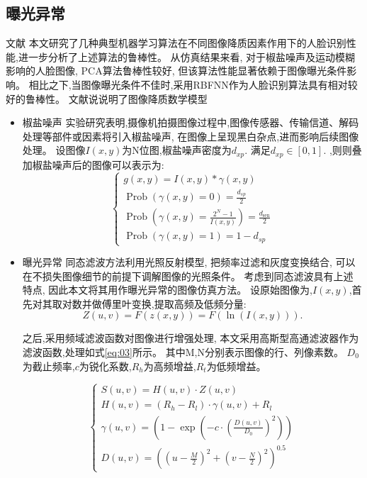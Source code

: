\message{ !name(main.tex)}\documentclass{amsart}
\begin{document}
\subsection{曝光异常}
文献 \cite{liliming} 本文研究了几种典型机器学习算法在不同图像降质因素作用下的人脸识别性能,进一步分析了上述算法的鲁棒性。
从仿真结果来看,
对于椒盐噪声及运动模糊影响的人脸图像,
PCA算法鲁棒性较好,
但该算法性能显著依赖于图像曝光条件影响。
相比之下,当图像曝光条件不佳时,采用RBFNN作为人脸识别算法具有相对较好的鲁棒性。
文献说说明了图像降质数学模型
\begin{itemize}
\item 椒盐噪声
  实验研究表明,摄像机拍摄图像过程中,图像传感器、传输信道、解码处理等部件或因素将引入椒盐噪声,
  在图像上呈现黑白杂点,进而影响后续图像处理。
  设图像$I(x,y)$为N位图,椒盐噪声密度为$d_{xp}$.
  满足$d_{xp}\in [0,1]$.
  ,则则叠加椒盐噪声后的图像可以表示为:
  \begin{equation}
    \label{eq:01}
  \left\{\begin{array}{l}
g(x, y)=I(x, y) * \gamma(x, y) \\
\operatorname{Prob}(\gamma(x, y)=0)=\frac{d_{s p}}{2} \\
\operatorname{Prob}\left(\gamma(x, y)=\frac{2^{N}-1}{I(x, y)}\right)=\frac{d_{\operatorname{sen}}}{2} \\
\operatorname{Prob}(\gamma(x, y)=1)=1-d_{s p}
\end{array}\right.
  \end{equation}

\item 曝光异常
  同态滤波方法利用光照反射模型,
  把频率过滤和灰度变换结合,
  可以在不损失图像细节的前提下调解图像的光照条件。
  考虑到同态滤波具有上述特点,
  因此本文将其用作曝光异常的图像仿真方法。
  设原始图像为,$I(x,y)$,首先对其取对数并做傅里叶变换,提取高频及低频分量:
  \begin{equation}
    \label{eq:02}
Z(u, v)=F(z(x, y))=F(\ln (I(x, y))).
  \end{equation}

  之后,采用频域滤波函数对图像进行增强处理,
  本文采用高斯型高通滤波器作为滤波函数,处理如式\ref{eq:03}所示。
  其中M,N分别表示图像的行、列像素数。
  $D_0$为截止频率,$c$为锐化系数,$R_h$为高频增益,$R_t$为低频增益。

  \begin{equation}
    \label{eq:03}
\left\{\begin{array}{l}
S(u, v)=H(u, v) \cdot Z(u, v) \\
H(u, v)=\left(R_{h}-R_{l}\right) \cdot \gamma(u, v)+R_{l} \\
\gamma(u, v)=\left(1-\exp \left(-c \cdot\left(\frac{D(u, v)}{D_{0}}\right)^{2}\right)\right) \\
D(u, v)=\left(\left(u-\frac{M}{2}\right)^{2}+\left(v-\frac{N}{2}\right)^{2}\right)^{0.5}
\end{array}\right.
  \end{equation}


\end{itemize}
\end{document}
